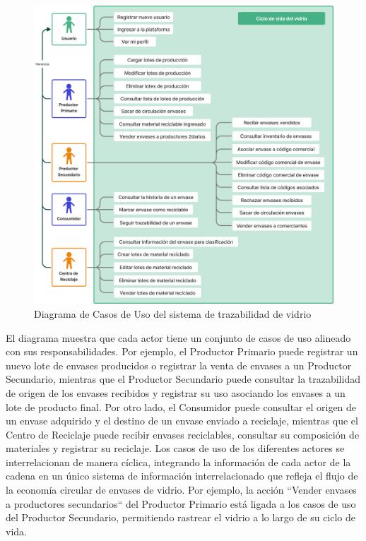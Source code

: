 \begin{figure}[!htb]
    \centering
    \includegraphics[width=\textwidth]{Figures/use-case-diagram.png}
    \caption{Diagrama de Casos de Uso del sistema de trazabilidad de vidrio}
    \label{fig:use-case-diagram}
\end{figure}

El diagrama muestra que cada actor tiene un conjunto de casos de uso alineado con sus responsabilidades. Por ejemplo, el Productor Primario puede registrar un nuevo lote de envases producidos o registrar la venta de envases a un Productor Secundario, mientras que el Productor Secundario puede consultar la trazabilidad de origen de los envases recibidos y registrar su uso asociando los envases a un lote de producto final. Por otro lado, el Consumidor puede consultar el origen de un envase adquirido y el destino de un envase enviado a reciclaje, mientras que el Centro de Reciclaje puede recibir envases reciclables, consultar su composición de materiales y registrar su reciclaje. Los casos de uso de los diferentes actores se interrelacionan de manera cíclica, integrando la información de cada actor de la cadena en un único sistema de información interrelacionado que refleja el flujo de la economía circular de envases de vidrio. Por ejemplo, la acción ``Vender envases a productores secundarios`` del Productor Primario está ligada a los casos de uso del Productor Secundario, permitiendo rastrear el vidrio a lo largo de su ciclo de vida.

